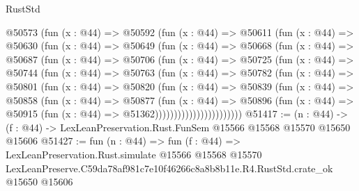 \begin{lexlean}{RustStd}
\begin{coremodule}
          @50573
            (fun (x : @44) =>
            @50592
              (fun (x : @44) =>
              @50611
                (fun (x : @44) =>
                @50630
                  (fun (x : @44) =>
                  @50649
                    (fun (x : @44) =>
                    @50668
                      (fun (x : @44) =>
                      @50687
                        (fun (x : @44) =>
                        @50706
                          (fun (x : @44) =>
                          @50725
                            (fun (x : @44) =>
                            @50744
                              (fun (x : @44) =>
                              @50763
                                (fun (x : @44) =>
                                @50782
                                  (fun (x : @44) =>
                                  @50801
                                    (fun (x : @44) =>
                                    @50820
                                      (fun (x : @44) =>
                                      @50839
                                        (fun (x : @44) =>
                                        @50858
                                          (fun (x : @44) =>
                                          @50877
                                            (fun (x : @44) =>
                                            @50896
                                              (fun (x : @44) =>
                                              @50915 (fun (x : @44) => @51362)))))))))))))))))))))))
@51417 := (n : @44) ->
  (f : @44) -> LexLeanPreservation.Rust.FunSem @15566 @15568 @15570 @15650 @15606
@51427 := fun (n : @44) =>
  fun (f : @44) =>
  LexLeanPreservation.Rust.simulate
    @15566
    @15568
    @15570
    LexLeanPreserve.C59da78af981c7e10f46266c8a8b8b11e.R4.RustStd.crate_ok
    @15650
    @15606
\end{coremodule}
\end{lexlean}

